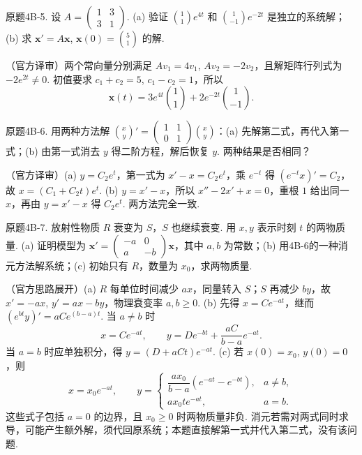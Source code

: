 \begin{exercise}\label{cw:bank-4B-5}原题4B-5. 设 $A=\begin{pmatrix}1&3\\3&1\end{pmatrix}$. (a) 验证 $\binom11e^{4t}$ 和 $\binom1{-1}e^{-2t}$ 是独立的系统解；(b) 求 $\mathbf x'=A\mathbf x$, $\mathbf x(0)=\binom51$ 的解.\end{exercise}
\begin{solution}（官方译审）两个常向量分别满足 $Av_1=4v_1$, $Av_2=-2v_2$，且解矩阵行列式为 $-2e^{2t}\ne0$. 初值要求 $c_1+c_2=5$, $c_1-c_2=1$，所以
\[\mathbf x(t)=3e^{4t}\binom11+2e^{-2t}\binom1{-1}.\]
\end{solution}
\begin{exercise}\label{cw:bank-4B-6}原题4B-6. 用两种方法解 $\binom{x}{y}'=\begin{pmatrix}1&1\\0&1\end{pmatrix}\binom{x}{y}$：(a) 先解第二式，再代入第一式；(b) 由第一式消去 $y$ 得二阶方程，解后恢复 $y$. 两种结果是否相同？\end{exercise}
\begin{solution}（官方译审）(a) $y=C_2e^t$，第一式为 $x'-x=C_2e^t$，乘 $e^{-t}$ 得 $(e^{-t}x)'=C_2$，故 $x=(C_1+C_2t)e^t$. (b) $y=x'-x$，所以 $x''-2x'+x=0$，重根 $1$ 给出同一 $x$，再由 $y=x'-x$ 得 $C_2e^t$. 两方法完全一致.\end{solution}
\begin{exercise}\label{cw:bank-4B-7}原题4B-7. 放射性物质 $R$ 衰变为 $S$，$S$ 也继续衰变. 用 $x,y$ 表示时刻 $t$ 的两物质量. (a) 证明模型为 $\mathbf x'=\begin{pmatrix}-a&0\\a&-b\end{pmatrix}\mathbf x$，其中 $a,b$ 为常数；(b) 用4B-6的一种消元方法解系统；(c) 初始只有 $R$，数量为 $x_0$，求两物质量.\end{exercise}
\begin{solution}（官方思路展开）(a) $R$ 每单位时间减少 $ax$，同量转入 $S$；$S$ 再减少 $by$，故 $x'=-ax$, $y'=ax-by$，物理衰变率 $a,b\ge0$. (b) 先得 $x=Ce^{-at}$，继而 $(e^{bt}y)'=aCe^{(b-a)t}$. 当 $a\ne b$ 时
\[x=Ce^{-at},\qquad y=De^{-bt}+\frac{aC}{b-a}e^{-at}.\]
当 $a=b$ 时应单独积分，得 $y=(D+aCt)e^{-at}$. (c) 若 $x(0)=x_0$, $y(0)=0$，则
\[x=x_0e^{-at},\qquad y=\begin{cases}\dfrac{ax_0}{b-a}(e^{-at}-e^{-bt}),&a\ne b,\\ax_0te^{-at},&a=b.\end{cases}\]
这些式子包括 $a=0$ 的边界，且 $x_0\ge0$ 时两物质量非负. 消元若需对两式同时求导，可能产生额外解，须代回原系统；本题直接解第一式并代入第二式，没有该问题.\end{solution}
